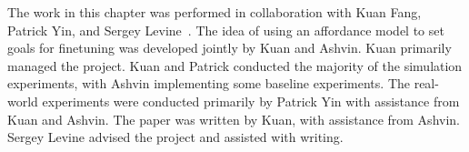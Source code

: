 The work in this chapter was performed in collaboration with Kuan Fang, Patrick Yin, and Sergey Levine~\citep{pong2019skewfit}. The idea of using an affordance model to set goals for finetuning was developed jointly by Kuan and Ashvin. Kuan primarily managed the project. Kuan and Patrick conducted the majority of the simulation experiments, with Ashvin implementing some baseline experiments. The real-world experiments were conducted primarily by Patrick Yin with assistance from Kuan and Ashvin. The paper was written by Kuan, with assistance from Ashvin. Sergey Levine advised the project and assisted with writing.


% 
% 


% 
